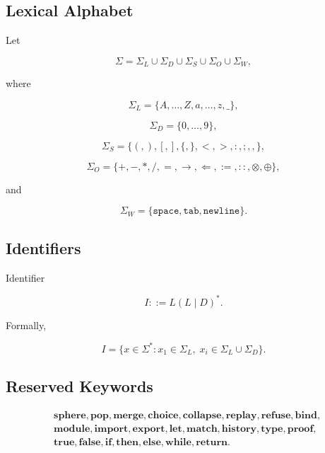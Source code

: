 \documentclass[12pt,oneside]{article}
\theoremstyle{definition}
\theoremstyle{remark}
\begin{document}
\subsection*{Lexical Alphabet}

Let

\[
\Sigma
=
\Sigma_L
\cup
\Sigma_D
\cup
\Sigma_S
\cup
\Sigma_O
\cup
\Sigma_W,
\]

where

\[
\Sigma_L
=
\{A,\ldots,Z,a,\ldots,z,\_\},
\]

\[
\Sigma_D
=
\{0,\ldots,9\},
\]

\[
\Sigma_S
=
\{
(,),
[,],
\{,\},
<,>,
:,;,
,
\},
\]

\[
\Sigma_O
=
\{
+,-,*,/,=,
\rightarrow,
\Leftarrow,
:=,
::,
\otimes,
\oplus
\},
\]

and

\[
\Sigma_W
=
\{\texttt{space},\texttt{tab},\texttt{newline}\}.
\]

\subsection*{Identifiers}

Identifier

\[
I
::=
L(L\mid D)^*.
\]

Formally,

\[
I
=
\{
x
\in
\Sigma^*
:
x_1
\in
\Sigma_L,
\;
x_i
\in
\Sigma_L
\cup
\Sigma_D
\}.
\]

\subsection*{Reserved Keywords}

\[
\begin{aligned}
&
\mathbf{sphere},
\mathbf{pop},
\mathbf{merge},
\mathbf{choice},
\mathbf{collapse},
\mathbf{replay},
\mathbf{refuse},
\mathbf{bind},
\\
&
\mathbf{module},
\mathbf{import},
\mathbf{export},
\mathbf{let},
\mathbf{match},
\mathbf{history},
\mathbf{type},
\mathbf{proof},
\\
&
\mathbf{true},
\mathbf{false},
\mathbf{if},
\mathbf{then},
\mathbf{else},
\mathbf{while},
\mathbf{return}.
\end{aligned}
\]
\end{document}
